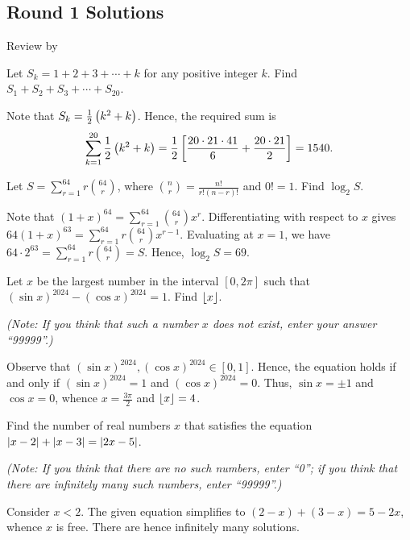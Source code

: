 \subsection{Round 1 Solutions}\label{S::2024-O-1}

\begin{resources}
    Review by 
\end{resources}

\begin{question}[1540]\label{Q::2024-O-1-1}
    Let $S_k = 1 + 2 + 3 + \cdots + k$ for any positive integer $k$. Find $S_1 + S_2 + S_3 + \cdots + S_{20}$.
\end{question}
\begin{solution*}
    Note that $S_k = \frac12 \left( k^2 + k \right)$. Hence, the required sum is \[\sum_{k= 1}^{20} \frac12 \left( k^2 + k \right) = \frac12 \left[ \frac{20 \cdot 21 \cdot 41}{6} + \frac{20 \cdot 21}{2} \right] = 1540.\]
\end{solution*}

\begin{question}[69]\label{Q::2024-O-1-2}
    Let $S = \sum_{r=1}^{64} r\binom{64}{r}$, where $\binom{n}{r} = \frac{n!}{r! (n-r)!}$ and $0! = 1$. Find $\log_2 S$.
\end{question}
\begin{solution*}
    Note that $(1 + x)^{64} = \sum_{r = 1}^{64} \binom{64}{r} x^{r}$. Differentiating with respect to $x$ gives $64 (1 + x)^{63} = \sum_{r = 1}^{64} r\binom{64}{r} x^{r-1}$. Evaluating at $x = 1$, we have $64 \cdot 2^{63} = \sum_{r = 1}^{64} r \binom{64}{r} = S$. Hence, $\log_2 S = 69$.
\end{solution*}

\begin{question}[4]\label{Q::2024-O-1-3}
    Let $x$ be the largest number in the interval $[0, 2\pi]$ such that $(\sin x)^{2024} - (\cos x)^{2024} = 1$. Find $\left\lfloor x \right\rfloor$.

    \noindent\textit{(Note: If you think that such a number $x$ does not exist, enter your answer ``99999''.)}
\end{question}
\begin{solution*}
    Observe that $(\sin x)^{2024}, (\cos x)^{2024} \in [0, 1]$. Hence, the equation holds if and only if $(\sin x)^{2024} = 1$ and $(\cos x)^{2024} = 0$. Thus, $\sin x = \pm 1$ and $\cos x = 0$, whence $x = \frac{3\pi}{2}$ and $\left\lfloor x \right\rfloor = 4$.
\end{solution*}

\begin{question}[99999]\label{Q::2024-O-1-4}
    Find the number of real numbers $x$ that satisfies the equation $\left\lvert x - 2 \right\rvert + \left\lvert x - 3 \right\rvert = \left\lvert 2x - 5 \right\rvert$.

    \noindent\textit{(Note: If you think that there are no such numbers, enter ``0''; if you think that there are infinitely many such numbers, enter ``99999''.)}
\end{question}
\begin{solution*}
    Consider $x < 2$. The given equation simplifies to $(2-x) + (3-x) = 5 - 2x$, whence $x$ is free. There are hence infinitely many solutions.
\end{solution*}

